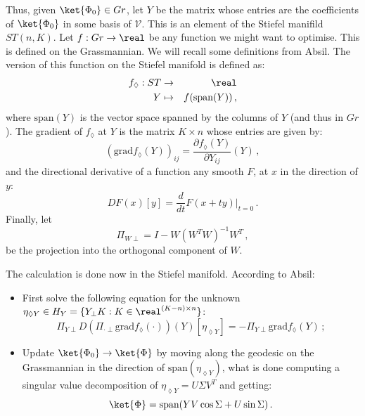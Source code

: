 \documentclass[a4paper,11pt]{article}
\begin{document}
Thus, given $\ket{\Phi_0} \in Gr$, let $Y$ be the matrix whose entries are the coefficients of $\ket{\Phi_0}$ in some basis of $\mathcal{V}$.
This is an element of the Stiefel manifild $ST(n,K)$.
Let $f : Gr \to \real$ be any function we might want to optimise.
This is defined on the Grassmannian.
We will recall some definitions from Absil.\cite{}
The version of this function on the Stiefel manifold is defined as:
\begin{eqnarray}
  f_{\lozenge} : ST &\to& \real\\
  Y &\mapsto& f(\text{span}(Y))\,,
\end{eqnarray}
where $\text{span}(Y)$ is the vector space spanned by the columns of $Y$ (and thus in $Gr$).
The gradient of $f_\lozenge$ at $Y$ is the matrix $K \times n$ whose entries are given by:
\begin{equation}
(\text{grad} f_\lozenge(Y))_{ij} = \frac{\partial f_\lozenge(Y)}{\partial Y_{ij}}(Y)\,,
\end{equation}
and the directional derivative of a function any smooth $F$, at $x$ in the direction of $y$:
\begin{equation}
  DF(x)[y] = \frac{d}{dt}F(x + ty)\big|_{t=0}\,.
\end{equation}
Finally, let
\begin{equation}
  \Pi_{W\perp} = I - W(W^TW)^{-1}W^T\,,
\end{equation}
be the projection into the orthogonal component of $W$.

The calculation is done now in the Stiefel manifold.
According to Absil:
\begin{itemize}
\item First solve the following equation for the unknown $\eta_{\lozenge Y} \in H_Y = \{Y_\perp K:K \in \real^{(K-n)\times n}\}$:
  \begin{equation}\label{eq:Absil_main_eq}
    \Pi_{Y\perp} D\left(\Pi_{\cdot{} \perp} \text{grad}f_\lozenge\left(\cdot{}\right) \right)
    \left(Y\right)\left[\eta_{\lozenge Y}\right] = -\Pi_{Y\perp}\text{grad}f_\lozenge\left(Y\right)\,;
  \end{equation}
\item Update $\ket{\Phi_0} \to \ket{\Phi}$ by moving along the geodesic on the Grassmannian in the direction of $\text{span}(\eta_{\lozenge Y})$, what is done computing a singular value decomposition of $\eta_{\lozenge Y} = U \Sigma V^T$ and getting:
  \begin{equation}
    \ket{\Phi} = \text{span}(Y V \cos \Sigma + U \sin \Sigma)\,.
  \end{equation}
\end{itemize}
\end{document}
